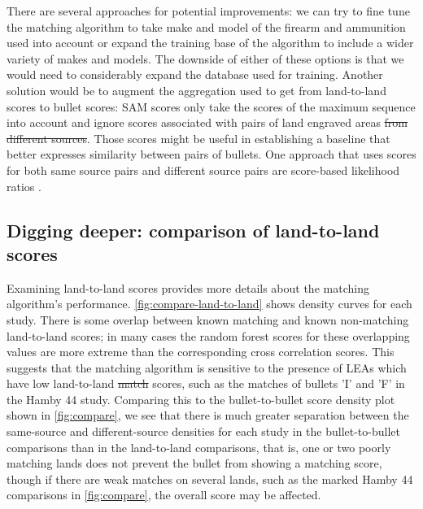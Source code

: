 \documentclass[doubleblind]{elsarticle}\usepackage[]{graphicx}\usepackage[]{color}
\providecommand{\DIFaddtex}[1]{{\protect\color{blue}\uwave{#1}}} %
\providecommand{\DIFdeltex}[1]{{\protect\color{red}\sout{#1}}}                      %
\providecommand{\DIFaddbegin}{} %
\providecommand{\DIFaddend}{} %
\providecommand{\DIFdelbegin}{} %
\providecommand{\DIFdelend}{} %
\providecommand{\DIFadd}[1]{\texorpdfstring{\DIFaddtex{#1}}{#1}} %
\providecommand{\DIFdel}[1]{\texorpdfstring{\DIFdeltex{#1}}{}} %
\newcommand{\DIFscaledelfig}{0.5}
\newlength{\DIFdelgraphicswidth} %
\newlength{\DIFdelgraphicsheight} %
\newcommand{\DIFaddincludegraphics}[2][]{{\color{blue}\fbox{\DIFOincludegraphics[#1]{#2}}}} %
\newcommand{\DIFdelincludegraphics}[2][]{%
\sbox{\DIFdelgraphicsbox}{\DIFOincludegraphics[#1]{#2}}%
\settoboxwidth{\DIFdelgraphicswidth}{\DIFdelgraphicsbox} %
\settoboxtotalheight{\DIFdelgraphicsheight}{\DIFdelgraphicsbox} %
\scalebox{\DIFscaledelfig}{%
\parbox[b]{\DIFdelgraphicswidth}{\usebox{\DIFdelgraphicsbox}\\[-\baselineskip] \rule{\DIFdelgraphicswidth}{0em}}\llap{\resizebox{\DIFdelgraphicswidth}{\DIFdelgraphicsheight}{%
\setlength{\unitlength}{\DIFdelgraphicswidth}%
\begin{picture}(1,1)%
\thicklines\linethickness{2pt} %
{\color[rgb]{1,0,0}\put(0,0){\framebox(1,1){}}}%
{\color[rgb]{1,0,0}\put(0,0){\line( 1,1){1}}}%
{\color[rgb]{1,0,0}\put(0,1){\line(1,-1){1}}}%
\end{picture}%
}\hspace*{3pt}}} %
} %
\DeclareRobustCommand{\DIFaddbegin}{\DIFOaddbegin \let\includegraphics\DIFaddincludegraphics} %
\DeclareRobustCommand{\DIFaddend}{\DIFOaddend \let\includegraphics\DIFOincludegraphics} %
\DeclareRobustCommand{\DIFdelbegin}{\DIFOdelbegin \let\includegraphics\DIFdelincludegraphics} %
\DeclareRobustCommand{\DIFdelend}{\DIFOaddend \let\includegraphics\DIFOincludegraphics} %
\begin{document}
There are several approaches for potential improvements: we can try to fine tune the matching algorithm to take make and model of the firearm and ammunition used into account or expand the training base of the algorithm to include a wider variety of makes and models. The downside of either of these options is that we would need to considerably expand the database used for training. Another solution would be to augment the aggregation used to get from land-to-land scores to bullet scores: SAM scores only take the scores of the maximum sequence into account and ignore scores associated with pairs of land engraved areas \DIFdelbegin \DIFdel{from different sources}\DIFdelend \DIFaddbegin \DIFadd{which are off the matching sequence}\DIFaddend . Those scores might be useful in establishing a baseline that better expresses similarity between pairs of bullets. One approach that uses scores for both same source pairs and different source pairs are score-based likelihood ratios \citep{Bunch:2013if, Morrison:2018fh}.

\subsection{Digging deeper: comparison of land-to-land scores}

Examining land-to-land scores provides more details about the matching algorithm's performance. \autoref{fig:compare-land-to-land} shows density curves for each study. There is some overlap between known matching and known non-matching land-to-land scores; in many cases the random forest scores for these overlapping values are more extreme than the corresponding cross correlation scores. This suggests that the matching algorithm is sensitive to the presence of LEAs which have low land-to-land \DIFdelbegin \DIFdel{match }\DIFdelend \DIFaddbegin \DIFadd{similarity }\DIFaddend scores, such as the matches of bullets 'I' and 'F' in the Hamby 44 study. Comparing this to the bullet-to-bullet score density plot shown in \autoref{fig:compare}, we see that there is much greater separation between the same-source and different-source densities for each study in the bullet-to-bullet comparisons than in the land-to-land comparisons, that is, one or two poorly matching lands does not prevent the bullet from showing a matching score, though if there are weak matches on several lands, such as the marked Hamby 44 comparisons in \autoref{fig:compare}, the overall score may be affected. 
\end{document}

